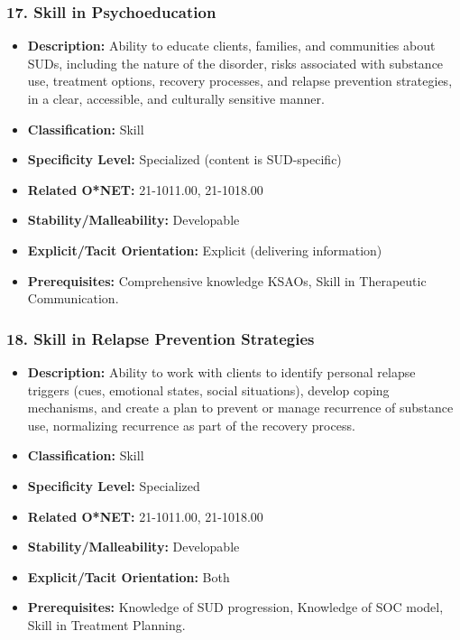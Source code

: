 \documentclass[
  letterpaper,
  DIV=11,
  numbers=noendperiod]{scrartcl}
\providecommand{\tightlist}{%
  \setlength{\itemsep}{0pt}\setlength{\parskip}{0pt}}
\begin{document}
\subsubsection{17. Skill in
Psychoeducation}\label{skill-in-psychoeducation}

\begin{itemize}
\tightlist
\item
  \textbf{Description:} Ability to educate clients, families, and
  communities about SUDs, including the nature of the disorder, risks
  associated with substance use, treatment options, recovery processes,
  and relapse prevention strategies, in a clear, accessible, and
  culturally sensitive manner.
\item
  \textbf{Classification:} Skill
\item
  \textbf{Specificity Level:} Specialized (content is SUD-specific)
\item
  \textbf{Related O*NET:} 21-1011.00, 21-1018.00
\item
  \textbf{Stability/Malleability:} Developable
\item
  \textbf{Explicit/Tacit Orientation:} Explicit (delivering information)
\item
  \textbf{Prerequisites:} Comprehensive knowledge KSAOs, Skill in
  Therapeutic Communication.
\end{itemize}

\subsubsection{18. Skill in Relapse Prevention
Strategies}\label{skill-in-relapse-prevention-strategies}

\begin{itemize}
\tightlist
\item
  \textbf{Description:} Ability to work with clients to identify
  personal relapse triggers (cues, emotional states, social situations),
  develop coping mechanisms, and create a plan to prevent or manage
  recurrence of substance use, normalizing recurrence as part of the
  recovery process.
\item
  \textbf{Classification:} Skill
\item
  \textbf{Specificity Level:} Specialized
\item
  \textbf{Related O*NET:} 21-1011.00, 21-1018.00
\item
  \textbf{Stability/Malleability:} Developable
\item
  \textbf{Explicit/Tacit Orientation:} Both
\item
  \textbf{Prerequisites:} Knowledge of SUD progression, Knowledge of SOC
  model, Skill in Treatment Planning.
\end{itemize}
\end{document}
